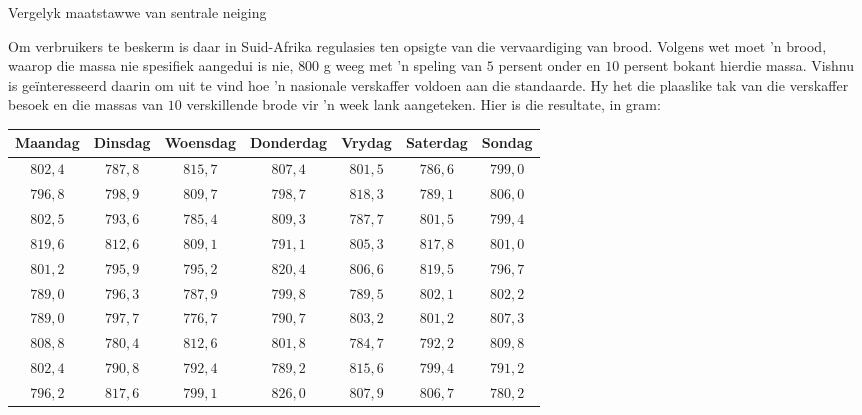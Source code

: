 \begin{wex}{
Vergelyk maatstawwe van sentrale neiging
}
{Om verbruikers te beskerm is daar in Suid-Afrika regulasies ten opsigte van die vervaardiging van brood. Volgens wet moet ’n brood, waarop die massa nie spesifiek aangedui is nie, $800$ g weeg met ’n speling van $5$ persent onder en $10$ persent bokant hierdie massa. Vishnu is geïnteresseerd daarin om uit te vind hoe ’n nasionale verskaffer voldoen aan die standaarde. Hy het die plaaslike tak van die verskaffer besoek en die massas van $10$ verskillende brode vir ’n week lank aangeteken. Hier is die resultate, in gram:\\

    \begin{center}
      \begin{tabular}{|c|c|c|c|c|c|c|} \hline
       
        \textbf{Maandag} & \textbf{Dinsdag} & \textbf{Woensdag} & \textbf{ Donderdag} & \textbf{Vrydag} & \textbf{Saterdag} & \textbf{Sondag} \\ \hline
        
        $802,4$ & $787,8$ & $815,7$ & $807,4$ & $801,5$ & $786,6$ & $799,0$ \\ \hline
        $796,8$ & $798,9$ & $809,7$ & $798,7$ & $818,3$ & $789,1$ & $806,0$ \\ \hline
        $802,5$ & $793,6$ & $785,4$ & $809,3$ & $787,7$ & $801,5$ & $799,4$ \\ \hline
        $819,6$ & $812,6$ & $809,1$ & $791,1$ & $805,3$ & $817,8$ & $801,0$ \\ \hline
        $801,2$ & $795,9$ & $795,2$ & $820,4$ & $806,6$ & $819,5$ & $796,7$ \\ \hline
        $789,0$ & $796,3$ & $787,9$ & $799,8$ & $789,5$ & $802,1$ & $802,2$ \\ \hline
        $789,0$ & $797,7$ & $776,7$ & $790,7$ & $803,2$ & $801,2$ & $807,3$ \\ \hline
        $808,8$ & $780,4$ & $812,6$ & $801,8$ & $784,7$ & $792,2$ & $809,8$ \\ \hline
        $802,4$ & $790,8$ & $792,4$ & $789,2$ & $815,6$ & $799,4$ & $791,2$ \\ \hline
        $796,2$ & $817,6$ & $799,1$ & $826,0$ & $807,9$ & $806,7$ & $780,2$ \\ \hline
       

\end{tabular}
\end{center}}
\end{wex}
